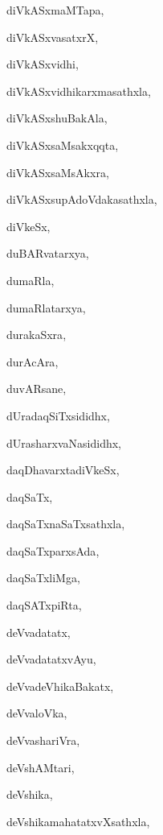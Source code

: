 \begin{multicols}{2}
{diVkASxmaMTapa}, \pageref{diVkASxmaMTapa}

{diVkASxvasatxrX}, \pageref{diVkASxvasatxrX}

{diVkASxvidhi}, \pageref{diVkASxvidhi}

{diVkASxvidhikarxmasathxla}, \pageref{diVkASxvidhikarxmasathxla}

{diVkASxshuBakAla}, \pageref{diVkASxshuBakAla}

{diVkASxsaMsakxqqta}, \pageref{diVkASxsaMsakxqqta}

{diVkASxsaMsAkxra}, \pageref{diVkASxsaMsAkxra}

{diVkASxsupAdoVdakasathxla}, \pageref{diVkASxsupAdoVdakasathxla}

{diVkeSx}, \pageref{diVkeSx}

{duBARvatarxya}, \pageref{duBARvatarxya}

{dumaRla}, \pageref{dumaRla}

{dumaRlatarxya}, \pageref{dumaRlatarxya}

{durakaSxra}, \pageref{durakaSxra}

{durAcAra}, \pageref{durAcAra}

{duvARsane}, \pageref{duvARsane}

{dUradaqSiTxsididhx}, \pageref{dUradaqSiTxsididhx}

{dUrasharxvaNasididhx}, \pageref{dUrasharxvaNasididhx}

{daqDhavarxtadiVkeSx}, \pageref{daqDhavarxtadiVkeSx}

{daqSaTx}, \pageref{daqSaTx}

{daqSaTxnaSaTxsathxla}, \pageref{daqSaTxnaSaTxsathxla}

{daqSaTxparxsAda}, \pageref{daqSaTxparxsAda}

{daqSaTxliMga}, \pageref{daqSaTxliMga}

{daqSATxpiRta}, \pageref{daqSATxpiRta}

{deVvadatatx}, \pageref{deVvadatatx}

{deVvadatatxvAyu}, \pageref{deVvadatatxvAyu}

{deVvadeVhikaBakatx}, \pageref{deVvadeVhikaBakatx}

{deVvaloVka}, \pageref{deVvaloVka}

{deVvashariVra}, \pageref{deVvashariVra}

{deVshAMtari}, \pageref{deVshAMtari}

{deVshika}, \pageref{deVshika}

{deVshikamahatatxvXsathxla}, \pageref{deVshikamahatatxvXsathxla}


\end{multicols}
